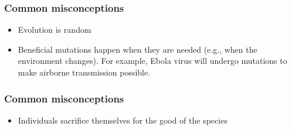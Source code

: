 \begin{noheadline}
\begin{frame}[t]
    \frametitle{Common misconceptions}
    \begin{adjustwidth}{-1.5em}{-1.5em}
        \begin{itemize}
            \normalsize
            \item Evolution is random 


                \vspace{5mm}
            \item Beneficial mutations happen when they are needed (e.g., when
                the environment changes). For example, Ebola virus will undergo
                mutations to make airborne transmission possible.
                

        \end{itemize}
    \end{adjustwidth}
\end{frame}
\end{noheadline}

\begin{noheadline}
\begin{frame}[t]
    \frametitle{Common misconceptions}
    \begin{adjustwidth}{-1.5em}{-1.5em}
        \begin{itemize}
            \normalsize
            \item Individuals sacrifice themselves for the good of the species


        \end{itemize}
    \end{adjustwidth}
\end{frame}
\end{noheadline}

